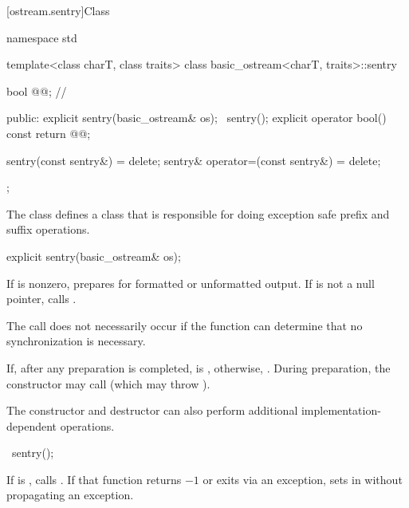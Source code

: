 [ostream.sentry]{Class }

%
%
\begin{codeblock}
namespace std {
  template<class charT, class traits>
  class basic_ostream<charT, traits>::sentry {
    bool @@;       // \expos

  public:
    explicit sentry(basic_ostream& os);
    ~sentry();
    explicit operator bool() const { return @@; }

    sentry(const sentry&) = delete;
    sentry& operator=(const sentry&) = delete;
  };
}
\end{codeblock}

\pnum
The class
defines a class that is responsible for doing exception safe prefix and suffix
operations.

%
\begin{itemdecl}
explicit sentry(basic_ostream& os);
\end{itemdecl}

\begin{itemdescr}
\pnum
If
is nonzero, prepares for formatted or unformatted output.
If
is not a null pointer, calls
%
.%
\begin{footnote}
The call
does not necessarily occur if the function can determine that no
synchronization is necessary.
\end{footnote}

\pnum
If, after any preparation is completed,
is
,
otherwise,
.
During preparation, the constructor may call
(which may throw
).
\begin{footnote}
The
constructor and destructor
can also perform additional
%
implementation-dependent operations.
\end{footnote}
\end{itemdescr}

%
\begin{itemdecl}
~sentry();
\end{itemdecl}

\begin{itemdescr}
\pnum
If
is
,
calls
. If that function returns $-1$ or
exits via an exception, sets  in
 without propagating an exception.
\end{itemdescr}

